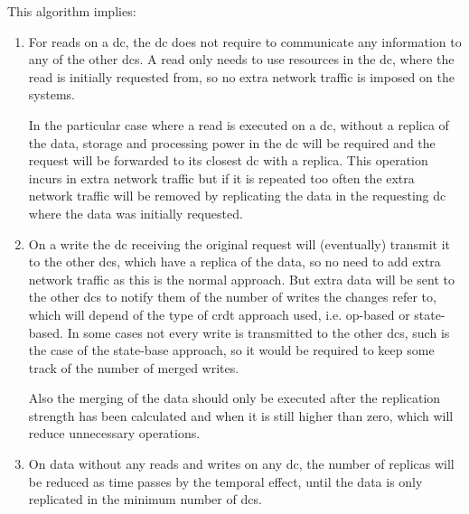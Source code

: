 \documentclass[12pt,twoside]{article}
\begin{document}
This algorithm implies:
\begin{enumerate}
	\item For reads on a \gls{dc}, the \gls{dc} does not require to communicate any information to any of the other \glspl{dc}. A read only needs to use resources in the \gls{dc}, where the read is initially requested from, so no extra network traffic is imposed on the systems.

	In the particular case where a read is executed on a \gls{dc}, without a replica of the data, storage and processing power in the \gls{dc} will be required and the request will be forwarded to its closest \gls{dc} with a replica. This operation incurs in extra network traffic but if it is repeated too often the extra network traffic will be removed by replicating the data in the requesting \gls{dc} where the data was initially requested.

	\item On a write the \gls{dc} receiving the original request will (eventually) transmit it to the other \glspl{dc}, which have a replica of the data, so no need to add extra network traffic as this is the normal approach. But extra data will be sent to the other \glspl{dc} to notify them of the number of writes the changes refer to, which will depend of the type of \gls{crdt} approach used, i.e. op-based or state-based. In some cases not every write is transmitted to the other \glspl{dc}, such is the case of the state-base approach, so it would be required to keep some track of the number of merged writes.

	Also the merging of the data should only be executed after the replication strength has been calculated and when it is still higher than zero, which will reduce unnecessary operations.

	\item On data without any reads and writes on any \gls{dc}, the number of replicas will be reduced as time passes by the temporal effect, until the data is only replicated in the minimum number of \glspl{dc}.
\end{enumerate}
\end{document}
